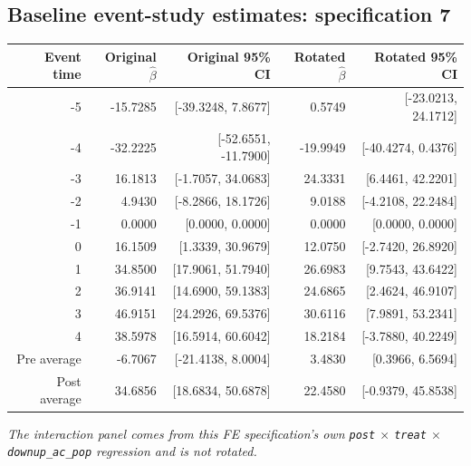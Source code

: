 \documentclass[10pt]{article}
\begin{document}
\subsection*{Baseline event-study estimates: specification 7}
\begin{center}
\scriptsize
\begin{tabular}{r rr rr}
\toprule
Event time & Original $\hat\beta$ & Original 95\% CI & Rotated $\hat\beta$ & Rotated 95\% CI \\
\midrule
-5 & -15.7285 & [-39.3248, 7.8677] & 0.5749 & [-23.0213, 24.1712] \\
-4 & -32.2225 & [-52.6551, -11.7900] & -19.9949 & [-40.4274, 0.4376] \\
-3 & 16.1813 & [-1.7057, 34.0683] & 24.3331 & [6.4461, 42.2201] \\
-2 & 4.9430 & [-8.2866, 18.1726] & 9.0188 & [-4.2108, 22.2484] \\
-1 & 0.0000 & [0.0000, 0.0000] & 0.0000 & [0.0000, 0.0000] \\
0 & 16.1509 & [1.3339, 30.9679] & 12.0750 & [-2.7420, 26.8920] \\
1 & 34.8500 & [17.9061, 51.7940] & 26.6983 & [9.7543, 43.6422] \\
2 & 36.9141 & [14.6900, 59.1383] & 24.6865 & [2.4624, 46.9107] \\
3 & 46.9151 & [24.2926, 69.5376] & 30.6116 & [7.9891, 53.2341] \\
4 & 38.5978 & [16.5914, 60.6042] & 18.2184 & [-3.7880, 40.2249] \\
\midrule
Pre average & -6.7067 & [-21.4138, 8.0004] & 3.4830 & [0.3966, 6.5694] \\
Post average & 34.6856 & [18.6834, 50.6878] & 22.4580 & [-0.9379, 45.8538] \\
\bottomrule
\end{tabular}
\end{center}
\medskip
\textit{The interaction panel comes from this FE specification's own \texttt{post} $\times$ \texttt{treat} $\times$ \texttt{downup\_ac\_pop} regression and is not rotated.}
\clearpage
\end{document}
